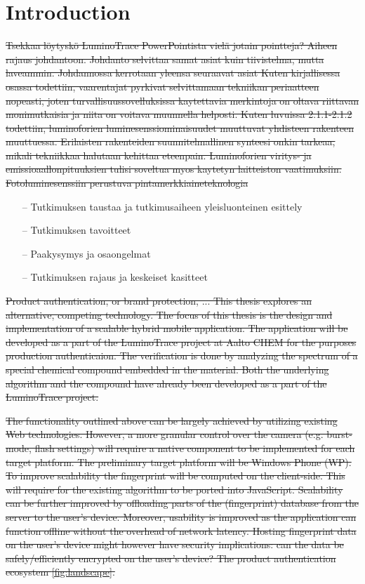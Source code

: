 \documentclass[thesis.tex]{subfiles}
\begin{document}
\chapter{Introduction}
\label{chapter:intro}



\sout{Tsekkaa löytyskö LuminoTrace PowerPointista vielä jotain pointteja?
Aiheen rajaus johdantoon.
Johdanto selvittaa samat asiat kuin tiivistelma, mutta laveammin. Johdannossa kerrotaan yleensa seuraavat asiat
Kuten kirjallisessa osassa todettiin, vaarentajat pyrkivat selvittamaan tekniikan periaatteen nopeasti, joten turvallisuussovelluksissa kaytettavia merkintoja on oltava riittavan monimutkaisia ja niita on voitava muunnella helposti. Kuten luvuissa 2.1.1-2.1.2 todettiin, luminoforien luminesenssiominaisuudet muuttuvat yhdisteen rakenteen muuttuessa. Erilaisten rakenteiden suunnitelmallinen synteesi onkin tarkeaa, mikali tekniikkaa halutaan kehittaa eteenpain. Luminoforien viritys- ja emissioaallonpituuksien tulisi soveltua myos kaytetyn laitteiston vaatimuksiin.
Fotoluminesenssiin perustuva pintamerkkiaineteknologia}

\begin{itemize}
\item[--]Tutkimuksen taustaa ja tutkimusaiheen yleisluonteinen esittely
\item[--]Tutkimuksen tavoitteet
\item[--]Paakysymys ja osaongelmat
\item[--]Tutkimuksen rajaus ja keskeiset kasitteet
\end{itemize}

\sout{Product authentication, or brand protection, ...
This thesis explores an alternative, competing technology.
The focus of this thesis is the design and implementation of a scalable hybrid mobile application. The application will be developed as a part of the LuminoTrace project at Aalto CHEM for the purposes production authenticaion.
The verification is done by analyzing the spectrum of a special chemical compound embedded in the material. Both the underlying algorithm and the compound have already been developed as a part of the LuminoTrace project.}

\sout{The functionality outlined above can be largely achieved by utilizing existing Web technologies. However, a more granular control over the camera (e.g. burst-mode, flash settings) will require a native component to be implemented for each target platform. The preliminary target platform will be Windows Phone (WP). To improve scalability the fingerprint will be computed on the client-side. This will require for the existing algorithm to be ported into JavaScript. Scalability can be further improved by offloading parts of the (fingerprint) database from the server to the user's device. Moreover, usability is improved as the application can function offline without the overhead of network latency. Hosting fingerprint data on the user's device might however have security implications: can the data be safely/efficiently encrypted on the user's device? The product authentication ecosystem \ref{fig:landscape}.}
\end{document}
